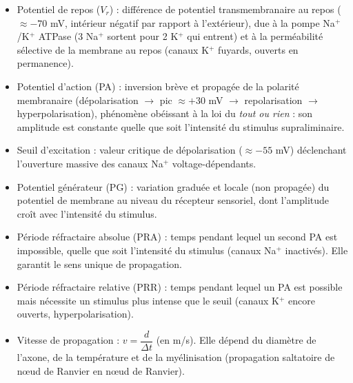 \documentclass[11pt]{article}
\newcommand{\cle}[1]{{\popxbold\color{popdark}#1}}
\begin{document}
\begin{aretenir}
\begin{itemize}
    \item \cle{Potentiel de repos ($V_r$)} : différence de potentiel transmembranaire au repos ($\approx -70$ mV, intérieur négatif par rapport à l'extérieur), due à la pompe Na$^+$/K$^+$ ATPase (3 Na$^+$ sortent pour 2 K$^+$ qui entrent) et à la perméabilité sélective de la membrane au repos (canaux K$^+$ fuyards, ouverts en permanence).
    \item \cle{Potentiel d'action (PA)} : inversion brève et propagée de la polarité membranaire (dépolarisation $\to$ pic $\approx +30$ mV $\to$ repolarisation $\to$ hyperpolarisation), phénomène obéissant à la loi du \emph{tout ou rien} : son amplitude est constante quelle que soit l'intensité du stimulus supraliminaire.
    \item \cle{Seuil d'excitation} : valeur critique de dépolarisation ($\approx -55$ mV) déclenchant l'ouverture massive des canaux Na$^+$ voltage-dépendants.
    \item \cle{Potentiel générateur (PG)} : variation graduée et locale (non propagée) du potentiel de membrane au niveau du récepteur sensoriel, dont l'amplitude croît avec l'intensité du stimulus.
    \item \cle{Période réfractaire absolue (PRA)} : temps pendant lequel un second PA est impossible, quelle que soit l'intensité du stimulus (canaux Na$^+$ inactivés). Elle garantit le sens unique de propagation.
    \item \cle{Période réfractaire relative (PRR)} : temps pendant lequel un PA est possible mais nécessite un stimulus plus intense que le seuil (canaux K$^+$ encore ouverts, hyperpolarisation).
    \item \cle{Vitesse de propagation} : $v = \dfrac{d}{\Delta t}$ (en m/s). Elle dépend du diamètre de l'axone, de la température et de la myélinisation (propagation saltatoire de nœud de Ranvier en nœud de Ranvier).
\end{itemize}
\end{aretenir}
\end{document}
